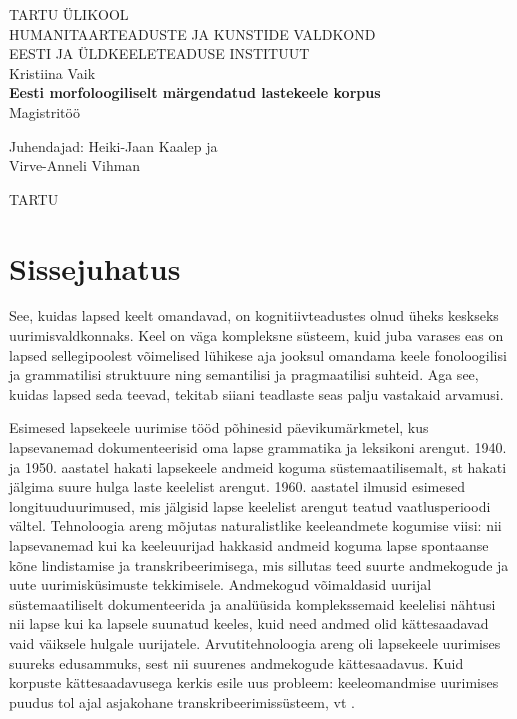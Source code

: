 \documentclass[12pt]{article}
\def\autor{Kristiina Vaik}
\def\pealkiri{Eesti morfoloogiliselt märgendatud lastekeele korpus}
\begin{document}
\begin{titlepage}
    \begin{center}
        {\large TARTU ÜLIKOOL}\\[0.3cm]
        {\large HUMANITAARTEADUSTE JA KUNSTIDE VALDKOND}\\[0.3cm]
        {\large EESTI JA ÜLDKEELETEADUSE INSTITUUT}\\[0.3cm]

        \vfill
        {\large \autor}\\[0.3cm]
        {\large \textbf{\pealkiri}}\\[0.3cm]
        {\large Magistritöö}

        \vfill
        \begin{center}
        {\large
            Juhendajad: Heiki-Jaan Kaalep ja \\
            Virve-Anneli Vihman
        }
        \end{center}
        \vfill
        {\large TARTU \the\year}
    \end{center}
\end{titlepage}

\tableofcontents

\newpage
\cleardoublepage
{}
{}

\section*{Sissejuhatus}

See, kuidas lapsed keelt omandavad, on kognitiivteadustes olnud üheks keskseks uurimisvaldkonnaks. Keel on väga kompleksne süsteem, kuid juba varases eas on lapsed sellegipoolest võimelised lühikese aja jooksul omandama keele fonoloogilisi ja grammatilisi struktuure ning semantilisi ja pragmaatilisi suhteid. Aga see, kuidas lapsed seda teevad, tekitab siiani teadlaste seas palju vastakaid arvamusi.

Esimesed lapsekeele uurimise tööd põhinesid päevikumärkmetel, kus lapsevanemad dokumenteerisid oma lapse grammatika ja leksikoni arengut. 1940. ja 1950. aastatel hakati lapsekeele andmeid koguma süstemaatilisemalt, st hakati jälgima suure hulga laste keelelist arengut. 1960. aastatel ilmusid esimesed longituuduurimused, mis jälgisid lapse keelelist arengut teatud vaatlusperioodi vältel. Tehnoloogia areng mõjutas naturalistlike keeleandmete kogumise viisi: nii lapsevanemad kui ka keeleuurijad hakkasid andmeid koguma lapse spontaanse kõne lindistamise ja transkribeerimisega, mis sillutas teed suurte andmekogude ja uute uurimisküsimuste tekkimisele. Andmekogud võimaldasid uurijal süstemaatiliselt dokumenteerida ja analüüsida komplekssemaid keelelisi nähtusi nii lapse kui ka lapsele suunatud keeles, kuid need andmed olid kättesaadavad vaid väiksele hulgale uurijatele. Arvutitehnoloogia areng oli lapsekeele uurimises suureks edusammuks, sest nii suurenes andmekogude kättesaadavus. \citep{Behrens} Kuid korpuste kättesaadavusega kerkis esile uus probleem: keeleomandmise uurimises puudus tol ajal asjakohane transkribeerimissüsteem, vt \citep{Ochs}.
\end{document}
